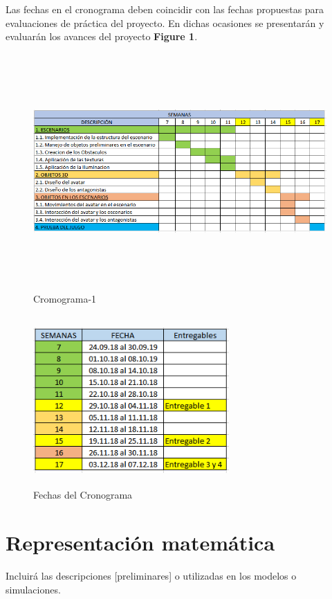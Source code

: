 \documentclass[a4paper]{article}
\begin{document}
Las fechas en el cronograma deben coincidir con las fechas propuestas para evaluaciones de práctica del proyecto. En dichas ocasiones se presentarán y evaluarán los avances del proyecto \textbf{Figure 1}.
\begin{figure}
	\centering
	\includegraphics[width=15.0cm,height=9.0cm]{Cronograma_1.PNG}
	\caption{Cromograma-1}
	\label{FI1_1}
\end{figure}


\begin{figure}
	\centering
	\includegraphics[width=7.5cm,height=6.5cm]{Cronograma_2.PNG}
	\caption{Fechas del Cronograma}
	\label{FI1_2}
\end{figure}



\pagebreak

\section{Representación matemática}
Incluirá las descripciones [preliminares] o utilizadas en los
modelos o simulaciones.
\end{document}
